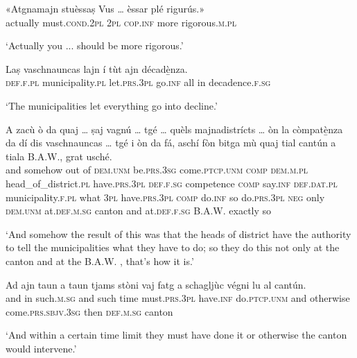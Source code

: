 \begin{linenumbers}
\gll «Atgnamajn stuèssaṣ Vus … èssar plé rigurús.»   \\
actually must.\textsc{cond.2pl} \textsc{2pl} {} \textsc{cop.inf} more rigorous.\textsc{m.pl}\\
\end{linenumbers}
\medskip
\glt `Actually you ... should be more rigorous.'
\medskip

\begin{linenumbers}
\gll Laṣ vaschnauncas lajn í tùt ajn décadè̱nza.   \\
 \textsc{def.f.pl} municipality.\textsc{pl} let.\textsc{prs.3pl} go.\textsc{inf} all in decadence.\textsc{f.sg}  \\
\end{linenumbers}
\medskip
\glt `The municipalities let everything go into decline.'
\medskip

\begin{linenumbers}
\gll A zacù ò da quaj … ṣaj vagnú … tgé … quèls majnadistrícts … òn la còmpatè̱nza da dí dis vaschnauncas … tgé i òn da fá, aschí fòn bitga mù quaj tial cantún a tiala B.A.W.\footnotemark, grat usché.\\
and somehow out of \textsc{dem.unm} {} be.\textsc{prs.3sg} come.\textsc{ptcp.unm} {} \textsc{comp} {} \textsc{dem.m.pl} head\_of\_district.\textsc{pl} {} have.\textsc{prs.3pl} \textsc{def.f.sg} competence \textsc{comp} {} say.\textsc{inf}  \textsc{def.dat.pl} municipality.\textsc{f.pl} {} what \textsc{3pl} have.\textsc{prs.3pl} \textsc{comp} do.\textsc{inf} so do.\textsc{prs.3pl} \textsc{neg} only  \textsc{dem.unm} at.\textsc{def.m.sg} canton and at.\textsc{def.f.sg} B.A.W. exactly so \\
\end{linenumbers}
\medskip
\glt `And somehow the result of this was that the heads of district have the authority to tell the municipalities what they have to do; so they do this not only at the canton and at the B.A.W. , that's how it is.'
\medskip

\begin{linenumbers}
\gll Ad ajn taun a taun tjams stòni vaj fatg a schagljùc végni lu al cantún.\\
and in such.\textsc{m.sg} and such time must.\textsc{prs.3pl} have.\textsc{inf} do.\textsc{ptcp.unm} and otherwise come.\textsc{prs.sbjv.3sg} then \textsc{def.m.sg} canton\\
\end{linenumbers}
\medskip
\glt `And within a certain time limit they must have done it or otherwise the canton would intervene.'
\medskip

